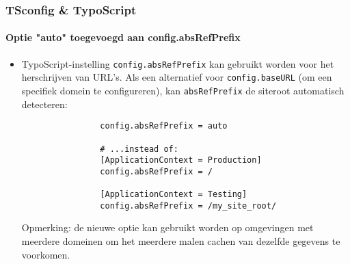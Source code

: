\begin{frame}[fragile]
	\frametitle{TSconfig \& TypoScript}
	\framesubtitle{Optie "auto" toegevoegd aan config.absRefPrefix}

	\begin{itemize}
		\item TypoScript-instelling \texttt{config.absRefPrefix} kan gebruikt worden voor het 
			herschrijven van URL's. Als een alternatief voor \texttt{config.baseURL} 
			(om een  specifiek domein te configureren), kan \texttt{absRefPrefix} 
			de siteroot automatisch detecteren:

			\begin{lstlisting}
				config.absRefPrefix = auto

				# ...instead of:
				[ApplicationContext = Production]
				config.absRefPrefix = /

				[ApplicationContext = Testing]
				config.absRefPrefix = /my_site_root/
			\end{lstlisting}

		\smaller
			Opmerking: de nieuwe optie kan gebruikt worden op omgevingen met meerdere domeinen
			om het meerdere malen cachen van dezelfde gegevens te voorkomen.
		\normalsize

	\end{itemize}

\end{frame}


